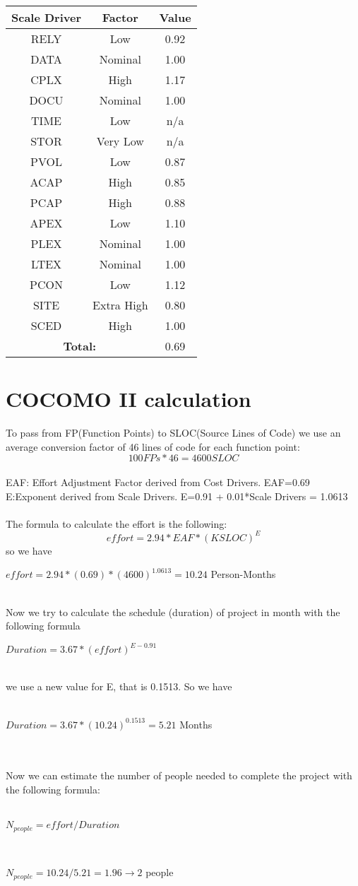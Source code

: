 \documentclass[12pt, oneside]{book}   	%
\begin{document}
\begin{table}[h]
\centering
\begin{tabular}{|c |c |c|}
\hline
Scale Driver & Factor & Value \\
\hline
RELY & Low & 0.92 \\
DATA & Nominal & 1.00  \\
CPLX & High & 1.17 \\
DOCU & Nominal & 1.00 \\
TIME & Low & n/a \\
STOR & Very Low & n/a \\
PVOL & Low & 0.87 \\
ACAP & High & 0.85 \\
PCAP & High & 0.88 \\
APEX & Low & 1.10 \\
PLEX & Nominal & 1.00 \\
LTEX & Nominal & 1.00 \\
PCON & Low & 1.12 \\
SITE & Extra High & 0.80 \\
SCED & High & 1.00 \\
\hline
\multicolumn{2}{|c|}{\textbf{Total:}} &  0.69\\
\hline
\end{tabular}
\end{table}
\section{COCOMO II calculation}
To pass from FP(Function Points) to SLOC(Source Lines of Code) we use an average conversion factor of 46 lines of code for each function point: \\
$$100 FPs * 46 = 4600 SLOC $$
\\
EAF: Effort Adjustment Factor derived from Cost Drivers. EAF=0.69\\
E:Exponent derived from Scale Drivers. E=0.91 + 0.01*Scale Drivers = 1.0613\\ \\
The formula to calculate the effort is the following:
$$effort = 2.94 * EAF * (KSLOC)^E$$
so we have\\
\centerline{$effort = 2.94 * (0.69) * (4600)^{1.0613} = 10.24$ Person-Months} \mbox{} \\
Now we try to calculate the schedule (duration) of project in month with the following formula\\
\centerline{$Duration = 3.67 * (effort)^{E-0.91}$} \mbox{} \\
we use a new value for E, that is 0.1513. So we have \\ \\
\centerline{$Duration = 3.67 *(10.24)^{0.1513} = 5.21$ Months} \mbox{} \\
\mbox{} \\
Now we can estimate the number of people needed to complete the project with
the following formula: \\ \\
\centerline{$N_{people} = effort / Duration$} \mbox{} \\
\centerline{$N_{people} = 10.24/5.21 = 1.96 \rightarrow 2$ people}
\end{document}
